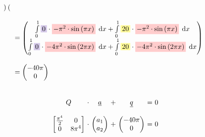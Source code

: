 \documentclass[
final,
a4paper,
oneside,
parskip=full,
headings=standardclasses,
headings=big,
pointednumbers,
fleqn
]{scrartcl}
\newcommand{\tfilly}[1]{\tfillc[#1][yellow!40]}
\newcommand{\tfillr}[1]{\tfillc[#1][red!20]}
\newcommand{\tfillv}[1]{\tfillc[#1][Violet!20]}
\newcommand*\difx{\; \mathop{}\!\mathrm{d}x}
\newcommand{\f}[2]{\frac{#1}{#2}}
\newcommand{\kl}[1]{{\left( #1 \right)}}
\begin{document}
{\begin{align*}
\begin{array}{ll}
\begin{pmatrix}
            \end{pmatrix} \\
            & \\
            & = \begin{pmatrix}
                \int\limits_{0}^{1}{\tfillv{$0$}       \cdot \tfillr{$-\pi^2 \cdot \sin\kl{\pi x}$} \difx} +
                \int\limits_{0}^{1}{\tfilly{$20$}      \cdot \tfillr{$-\pi^2 \cdot \sin\kl{\pi x}$} \difx} \\
                \int\limits_{0}^{1}{\tfillv{$0$}       \cdot \tfillr{$-4 \pi^2 \cdot \sin\kl{2 \pi x}$} \difx} +
                \int\limits_{0}^{1}{\tfilly{$20$}      \cdot \tfillr{$-4 \pi^2 \cdot \sin\kl{2 \pi x}$} \difx}
            \end{pmatrix} \\
            & \\
            & = \begin{pmatrix}
                -40 \pi \\
                0
            \end{pmatrix}
        \end{array}
    \end{align*}} \\
    {\setlength{\abovedisplayskip}{6pt}
    \setlength{\belowdisplayskip}{-12pt}
    \begin{align*}
        \begin{array}{c@{\ }c@{\ }c@{\ }c@{\ }c@{\ }c@{\ }l}
            Q & \cdot & \uline{a} & + & \uline{q} & = & 0 \\
            \\
            \begin{bmatrix}
                \f{\pi^4}{2} & 0 \\
                0             & 8\pi^4
            \end{bmatrix} & \cdot &
            \begin{pmatrix}
                a_1 \\
                a_2
            \end{pmatrix} & + &
            \begin{pmatrix}
                -40 \pi \\
                0
            \end{pmatrix} & = & 0
            \\
        \end{array}
    \end{align*}} \\
\end{document}
